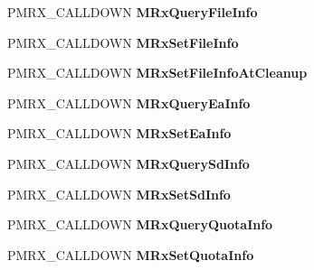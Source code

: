 \begin{DoxyCompactItemize}
P\+M\+R\+X\+\_\+\+C\+A\+L\+L\+D\+O\+WN {\bfseries M\+Rx\+Query\+File\+Info}
\item 
\mbox{\label{struct___m_i_n_i_r_d_r___d_i_s_p_a_t_c_h_ac60990ca6b1b4f27f023b281b214ddc6}} 
P\+M\+R\+X\+\_\+\+C\+A\+L\+L\+D\+O\+WN {\bfseries M\+Rx\+Set\+File\+Info}
\item 
\mbox{\label{struct___m_i_n_i_r_d_r___d_i_s_p_a_t_c_h_a3ed98609b2e62c6c9be56d91b19f809d}} 
P\+M\+R\+X\+\_\+\+C\+A\+L\+L\+D\+O\+WN {\bfseries M\+Rx\+Set\+File\+Info\+At\+Cleanup}
\item 
\mbox{\label{struct___m_i_n_i_r_d_r___d_i_s_p_a_t_c_h_a33ae7d4414cb3b9c0b5a46d7cb2a8c2c}} 
P\+M\+R\+X\+\_\+\+C\+A\+L\+L\+D\+O\+WN {\bfseries M\+Rx\+Query\+Ea\+Info}
\item 
\mbox{\label{struct___m_i_n_i_r_d_r___d_i_s_p_a_t_c_h_ae139bbda316eed7552f89a551cfa3c39}} 
P\+M\+R\+X\+\_\+\+C\+A\+L\+L\+D\+O\+WN {\bfseries M\+Rx\+Set\+Ea\+Info}
\item 
\mbox{\label{struct___m_i_n_i_r_d_r___d_i_s_p_a_t_c_h_a88d501c001dc3c3bce58933cf365f098}} 
P\+M\+R\+X\+\_\+\+C\+A\+L\+L\+D\+O\+WN {\bfseries M\+Rx\+Query\+Sd\+Info}
\item 
\mbox{\label{struct___m_i_n_i_r_d_r___d_i_s_p_a_t_c_h_a68a462ba8afb8b95403151cfdef82db1}} 
P\+M\+R\+X\+\_\+\+C\+A\+L\+L\+D\+O\+WN {\bfseries M\+Rx\+Set\+Sd\+Info}
\item 
\mbox{\label{struct___m_i_n_i_r_d_r___d_i_s_p_a_t_c_h_a2cb1c50b50eeadc8ccb03b47e389042b}} 
P\+M\+R\+X\+\_\+\+C\+A\+L\+L\+D\+O\+WN {\bfseries M\+Rx\+Query\+Quota\+Info}
\item 
\mbox{\label{struct___m_i_n_i_r_d_r___d_i_s_p_a_t_c_h_a4eadc4100efd6fddb1923bb856444ec6}} 
P\+M\+R\+X\+\_\+\+C\+A\+L\+L\+D\+O\+WN {\bfseries M\+Rx\+Set\+Quota\+Info}
\item 
\mbox{\label{struct___m_i_n_i_r_d_r___d_i_s_p_a_t_c_h_ac952e65f9996af85bc472d0db4876768}} 

\end{DoxyCompactItemize}
